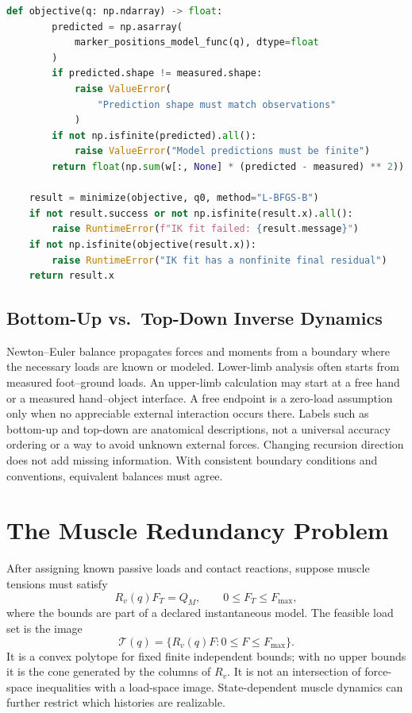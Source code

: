 \begin{lstlisting}[language=Python, caption={A Local Single-Frame Marker Fit With Failure Checks}]
    def objective(q: np.ndarray) -> float:
        predicted = np.asarray(
            marker_positions_model_func(q), dtype=float
        )
        if predicted.shape != measured.shape:
            raise ValueError(
                "Prediction shape must match observations"
            )
        if not np.isfinite(predicted).all():
            raise ValueError("Model predictions must be finite")
        return float(np.sum(w[:, None] * (predicted - measured) ** 2))

    result = minimize(objective, q0, method="L-BFGS-B")
    if not result.success or not np.isfinite(result.x).all():
        raise RuntimeError(f"IK fit failed: {result.message}")
    if not np.isfinite(objective(result.x)):
        raise RuntimeError("IK fit has a nonfinite final residual")
    return result.x
\end{lstlisting}

\subsection{Bottom-Up vs.\ Top-Down Inverse Dynamics}

Newton--Euler balance propagates forces and moments from a boundary where the
necessary loads are known or modeled. Lower-limb analysis often starts from
measured foot--ground loads. An upper-limb calculation may start at a free hand
or a measured hand--object interface. A free endpoint is a zero-load assumption
only when no appreciable external interaction occurs there.
Labels such as bottom-up and top-down are anatomical descriptions, not a
universal accuracy ordering or a way to avoid unknown external forces.
Changing recursion direction does not add missing information. With consistent
boundary conditions and conventions, equivalent balances must agree.

\section{The Muscle Redundancy Problem}

After assigning known passive loads and contact reactions, suppose muscle
tensions must satisfy
\begin{equation}
 R_v(q)F_T=Q_M,\qquad 0\leq F_T\leq F_{\max},
 \label{eq:ch6:redundancy}
\end{equation}
where the bounds are part of a declared instantaneous model.
The feasible load set is the image
\[
 \mathcal T(q)=\{R_v(q)F:0\leq F\leq F_{\max}\}.
\]
It is a convex polytope for fixed finite independent bounds; with no upper
bounds it is the cone generated by the columns of $R_v$.
It is not an intersection of force-space inequalities with a load-space image.
State-dependent muscle dynamics can further restrict which histories are realizable.

